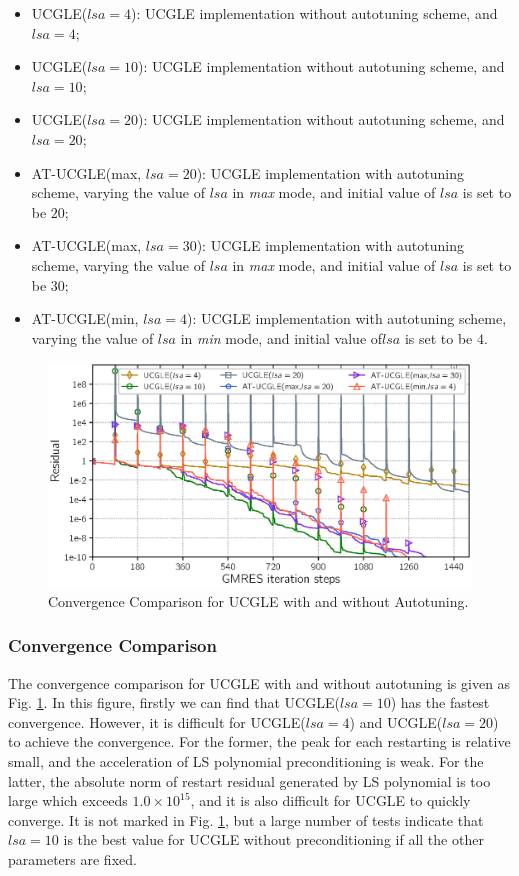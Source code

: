 \begin{itemize}
	\item UCGLE($lsa=4$): UCGLE implementation without autotuning scheme, and $lsa=4$;
	\item UCGLE($lsa=10$): UCGLE implementation without autotuning scheme, and $lsa=10$;
	\item UCGLE($lsa=20$):  UCGLE implementation without autotuning scheme, and $lsa=20$;
	\item AT-UCGLE(max, $lsa=20$): UCGLE implementation with autotuning scheme, varying the value of $lsa$ in \textit{max} mode, and initial value of $lsa$ is set to be $20$;
	\item AT-UCGLE(max, $lsa=30$): UCGLE implementation with autotuning scheme, varying the value of $lsa$ in \textit{max} mode, and initial value of $lsa$ is set to be $30$;
	\item AT-UCGLE(min, $lsa=4$):  UCGLE implementation with autotuning scheme, varying the value of $lsa$ in \textit{min} mode, and initial value of$lsa$ is set to be $4$.
\end{itemize}
	\begin{figure}
		\centering
		\includegraphics[width=0.99\linewidth]{fig/autotuning.eps}
		\caption{Convergence Comparison for UCGLE with and without Autotuning.}
		\label{fig:autotuning}
	\end{figure}

\subsubsection{Convergence Comparison}

The convergence comparison for UCGLE with and without autotuning is given as Fig. \ref{fig:autotuning}. In this figure, firstly we can find that UCGLE($lsa=10$) has the fastest convergence. However, it is difficult for UCGLE($lsa=4$) and UCGLE($lsa=20$) to achieve the convergence. For the former, the peak for each restarting is relative small, and the acceleration of LS polynomial preconditioning is weak. For the latter, the absolute norm of restart residual generated by LS polynomial is too large which exceeds $1.0\times10^{15}$, and it is also difficult for UCGLE to quickly converge. It is not marked in Fig. \ref{fig:autotuning}, but a large number of tests indicate that $lsa=10$ is the best value for UCGLE without preconditioning if all the other parameters are fixed.

